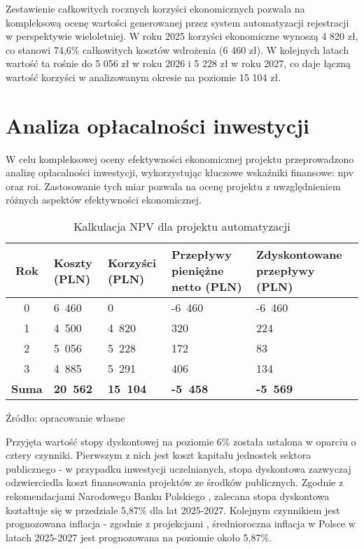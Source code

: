 Zestawienie całkowitych rocznych korzyści ekonomicznych pozwala na kompleksową ocenę wartości generowanej przez system automatyzacji rejestracji w perspektywie wieloletniej. W roku 2025 korzyści ekonomiczne wynoszą 4 820 zł, co stanowi  74,6\% całkowitych kosztów wdrożenia (6 460 zł). W kolejnych latach wartość ta rośnie do 5 056 zł w roku 2026 i 5 228 zł w roku 2027, co daje łączną wartość korzyści w analizowanym okresie na poziomie 15 104 zł.

\section{Analiza opłacalności inwestycji}

W celu kompleksowej oceny efektywności ekonomicznej projektu przeprowadzono analizę opłacalności inwestycji, wykorzystując kluczowe wskaźniki finansowe: \gls{npv} oraz \gls{roi}. Zastosowanie tych miar pozwala na ocenę projektu z uwzględnieniem różnych aspektów efektywności ekonomicznej.

\begin{table}[ht]
    \centering
    \caption[Kalkulacja NPV dla projektu automatyzacji, źródło: opracowanie własne]{Kalkulacja NPV dla projektu automatyzacji}
    \renewcommand{\arraystretch}{1.3} %
    \begin{tabular}{| c | p{} | p{} | p{} | p{} |}
        \hline
        \textbf{Rok} & \textbf{Koszty (PLN)} & \textbf{Korzyści (PLN)} & \textbf{Przepływy pieniężne netto (PLN)} & \textbf{Zdyskontowane przepływy (PLN)} \\
        \hline
        0 & 6~460 & 0 & -6~460 & -6~460 \\
        \hline
        1 & 4~500 & 4~820 & 320 & 224 \\
        \hline
        2 & 5~056 & 5~228 & 172 & 83 \\
        \hline
        3 & 4~885 & 5~291 & 406 & 134 \\
        \hline
        \textbf{Suma} & \textbf{20~562} & \textbf{15~104} & \textbf{-5~458} & \textbf{-5~569} \\
        \hline
    \end{tabular}
    \vspace{0.5em}
    \par\raggedright\footnotesize{Źródło: opracowanie własne}
\end{table}

Przyjęta wartość stopy dyskontowej na poziomie 6\% została ustalona w oparciu o cztery czynniki. Pierwszym z nich jest koszt kapitału jednostek sektora publicznego - w przypadku inwestycji uczelnianych, stopa dyskontowa zazwyczaj odzwierciedla koszt finansowania projektów ze środków publicznych. Zgodnie z rekomendacjami Narodowego Banku Polskiego \cite{NBP2023stopy}, zalecana stopa dyskontowa kształtuje się w przedziale 5,87\% dla lat 2025-2027. Kolejnym czynnikiem jest prognozowana inflacja - zgodnie z projekcjami \cite{NBP2025}, średnioroczna inflacja w Polsce w latach 2025-2027 jest prognozowana na poziomie około 5,87\%. 

